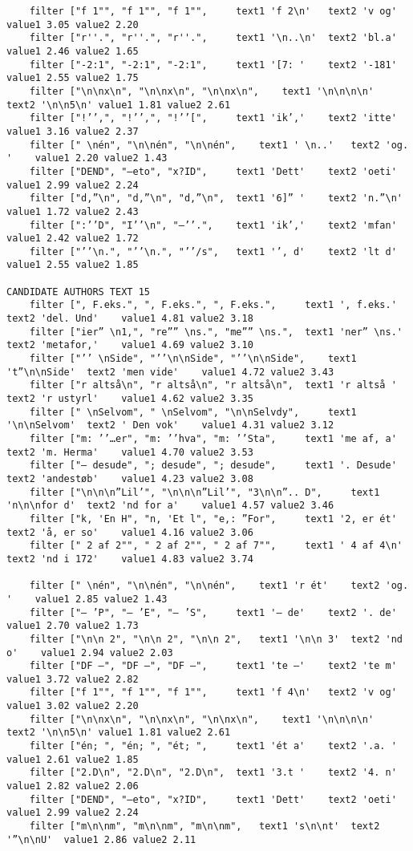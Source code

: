 {\begin{verbatim}
	filter ["f 1"", "f 1"", "f 1"", 	text1 'f 2\n'	text2 'v og'	value1 3.05	value2 2.20
	filter ["r''.", "r''.", "r''.", 	text1 '\n..\n'	text2 'bl.a'	value1 2.46	value2 1.65
	filter ["-2:1", "-2:1", "-2:1", 	text1 '[7: '	text2 '-181'	value1 2.55	value2 1.75
	filter ["\n\nx\n", "\n\nx\n", "\n\nx\n", 	text1 '\n\n\n\n'	text2 '\n\n5\n'	value1 1.81	value2 2.61
	filter ["!’’,", "!’’,", "!’’[", 	text1 'ik’,'	text2 'itte'	value1 3.16	value2 2.37
	filter [" \nén", "\n\nén", "\n\nén", 	text1 ' \n..'	text2 'og. '	value1 2.20	value2 1.43
	filter ["DEND", "–eto", "x?ID", 	text1 'Dett'	text2 'oeti'	value1 2.99	value2 2.24
	filter ["d,”\n", "d,”\n", "d,”\n", 	text1 '6]” '	text2 'n.”\n'	value1 1.72	value2 2.43
	filter [":’’D", "I’’\n", "–’’.", 	text1 'ik’,'	text2 'mfan'	value1 2.42	value2 1.72
	filter ["’’\n.", "’’\n.", "’’/s", 	text1 '’, d'	text2 'lt d'	value1 2.55	value2 1.85

CANDIDATE AUTHORS TEXT 15
	filter [", F.eks.", ", F.eks.", ", F.eks.", 	text1 ', f.eks.'	text2 'del. Und'	value1 4.81	value2 3.18
	filter ["ier” \n1,", "re”” \ns.", "me”” \ns.", 	text1 'ner” \ns.'	text2 'metafor,'	value1 4.69	value2 3.10
	filter ["’’ \nSide", "’’\n\nSide", "’’\n\nSide", 	text1 't”\n\nSide'	text2 'men vide'	value1 4.72	value2 3.43
	filter ["r altså\n", "r altså\n", "r altså\n", 	text1 'r altså '	text2 'r ustyrl'	value1 4.62	value2 3.35
	filter [" \nSelvom", " \nSelvom", "\n\nSelvdy", 	text1 '\n\nSelvom'	text2 ' Den vok'	value1 4.31	value2 3.12
	filter ["m: ’’…er", "m: ’’hva", "m: ’’Sta", 	text1 'me af, a'	text2 'm. Herma'	value1 4.70	value2 3.53
	filter ["– desude", "; desude", "; desude", 	text1 '. Desude'	text2 'andestøb'	value1 4.23	value2 3.08
	filter ["\n\n\n”Lil’", "\n\n\n”Lil’", "3\n\n”.. D", 	text1 'n\n\nfor d'	text2 'nd for a'	value1 4.57	value2 3.46
	filter ["k, 'En H", "n, 'Et l", "e,: ”For", 	text1 '2, er ét'	text2 'å, er so'	value1 4.16	value2 3.06
	filter [" 2 af 2"", " 2 af 2"", " 2 af 7"", 	text1 ' 4 af 4\n'	text2 'nd i 172'	value1 4.83	value2 3.74

	filter [" \nén", "\n\nén", "\n\nén", 	text1 'r ét'	text2 'og. '	value1 2.85	value2 1.43
	filter ["– ’P", "– ’E", "– ’S", 	text1 '– de'	text2 '. de'	value1 2.70	value2 1.73
	filter ["\n\n 2", "\n\n 2", "\n\n 2", 	text1 '\n\n 3'	text2 'nd o'	value1 2.94	value2 2.03
	filter ["DF –", "DF –", "DF –", 	text1 'te –'	text2 'te m'	value1 3.72	value2 2.82
	filter ["f 1"", "f 1"", "f 1"", 	text1 'f 4\n'	text2 'v og'	value1 3.02	value2 2.20
	filter ["\n\nx\n", "\n\nx\n", "\n\nx\n", 	text1 '\n\n\n\n'	text2 '\n\n5\n'	value1 1.81	value2 2.61
	filter ["én; ", "én; ", "ét; ", 	text1 'ét a'	text2 '.a. '	value1 2.61	value2 1.85
	filter ["2.D\n", "2.D\n", "2.D\n", 	text1 '3.t '	text2 '4. n'	value1 2.82	value2 2.06
	filter ["DEND", "–eto", "x?ID", 	text1 'Dett'	text2 'oeti'	value1 2.99	value2 2.24
	filter ["m\n\nm", "m\n\nm", "m\n\nm", 	text1 's\n\nt'	text2 '”\n\nU'	value1 2.86	value2 2.11


\end{verbatim}}
